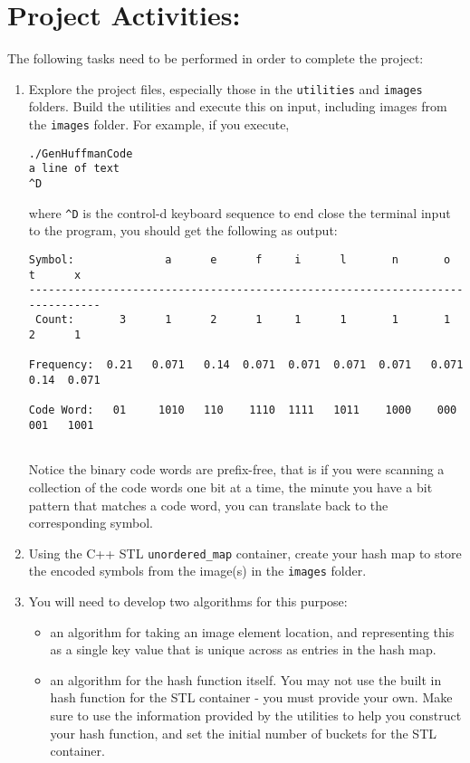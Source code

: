 \documentclass[10pt]{article}
\begin{document}
\section*{Project Activities:}

The following tasks need to be performed in order to complete the project:

\newcommand{\tab}{\hspace{3em}}

\begin{enumerate}
	\item Explore the project files, especially those in the \verb|utilities| and \verb|images| folders. Build the utilities and execute this on input, including images from the \verb|images| folder. For example, if you execute,
  \begin{verbatim}
./GenHuffmanCode 
a line of text
^D
  \end{verbatim}

  where \verb|^D| is the control-d keyboard sequence to end close the terminal input to the program, you should get the following as output:
  \begin{verbatim}
Symbol:              a      e      f     i      l       n       o     t      x
------------------------------------------------------------------------------ 
 Count:       3      1      2      1     1      1       1       1     2      1
    
Frequency:  0.21   0.071   0.14  0.071  0.071  0.071  0.071   0.071  0.14  0.071
    
Code Word:   01     1010   110    1110  1111   1011    1000    000    001   1001
    
  \end{verbatim}

  Notice the binary code words are prefix-free, that is if you were scanning a collection of the code words one bit at a time, the minute you have a bit pattern that matches a code word, you can translate back to the corresponding symbol.

	\item Using the C++ STL \verb|unordered_map| container, create your hash map to store the encoded symbols from the image(s) in the \verb|images| folder. 

	\item You will need to develop two algorithms for this purpose:
  \begin{itemize}
    \item an algorithm for taking an image element location, and representing this as a single key value that is unique across as entries in the hash map.
    \item an algorithm for the hash function itself. You may not use the built in hash function for the STL container - you must provide your own. Make sure to use the information provided by the utilities to help you construct your hash function, and set the initial number of buckets for the STL container.
  \end{itemize}


\end{enumerate}
\end{document}
